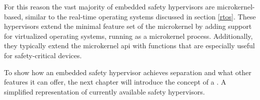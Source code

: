 For this reason the vast majority of embedded safety hypervisors are microkernel-based, similar to the real-time operating systems discussed in section \ref{rtos}. These hypervisors extend the minimal feature set of the microkernel by adding support for virtualized operating systems, running as a microkernel process. Additionally, they typically extend the microkernel \acrshort{api} with functions that are especially useful for safety-critical devices.

To show how an embedded safety hypervisor achieves separation and what other features it can offer, the next chapter will introduce the concept of a . A simplified representation of currently available safety hypervisors.

